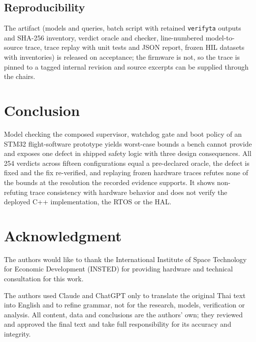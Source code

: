 \documentclass[conference,a4paper]{IEEEtran}
\newif\ifanon
\newif\ifcontrib
\begin{document}
\subsection{Reproducibility}
The artifact (models and queries, batch script with retained \texttt{verifyta} outputs and SHA-256 inventory, verdict oracle and checker, line-numbered model-to-source trace, trace replay with unit tests and JSON report, frozen HIL datasets with inventories) is released on acceptance; the firmware is not, so the trace is pinned to a tagged internal revision and source excerpts can be supplied through the chairs.

\section{Conclusion}
Model checking the composed supervisor, watchdog gate and boot policy of an STM32 flight-software prototype yields worst-case bounds a bench cannot provide and exposes one defect in shipped safety logic with three design consequences. All 254 verdicts across fifteen configurations equal a pre-declared oracle, the defect is fixed and the fix re-verified, and replaying frozen hardware traces refutes none of the bounds at the resolution the recorded evidence supports. It shows non-refuting trace consistency with hardware behavior and does not verify the deployed C++ implementation, the RTOS or the HAL.

\section*{Acknowledgment}
\ifanon
The authors thank the institute that provided hardware and technical consultation for this work; its name is withheld for double-anonymous review.
\else
The authors would like to thank the International Institute of Space Technology for Economic Development (INSTED) for providing hardware and technical consultation for this work.
\fi
The authors used Claude and ChatGPT only to translate the original Thai text into English and to refine grammar, not for the research, models, verification or analysis. All content, data and conclusions are the authors' own; they reviewed and approved the final text and take full responsibility for its accuracy and integrity.
\ifcontrib
\textit{Author contributions:} B.~Dendumrongkul developed the UPPAAL models, specified the properties and ran the verification; N.~Hirunsirikul led the HIL fault-injection campaign and trace analysis; T.~Sriwaranon and P.~Wanitchollakit contributed to the STM32 firmware and its tests; P.~Saisutjarit provided aerospace-engineering guidance and CubeSat system context; P.~Kanongchaiyos supervised the research and directed the model-checking methodology. \textit{Funding:} the work received no external funding. The authors declare no conflicts of interest.
\fi

\balance


\end{document}
